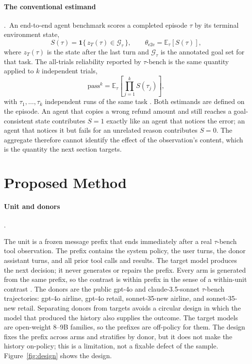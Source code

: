 \documentclass[a4paper,fleqn]{cas-sc}
\begin{document}
\paragraph{The conventional estimand}.\
An end-to-end agent benchmark scores a completed episode $\tau$ by its terminal environment state,
\begin{equation}
  S(\tau)=\mathbf{1}\{\,z_T(\tau)\in\mathcal{G}_\tau\,\},
  \qquad
  \theta_{\mathrm{e2e}}=\mathbb{E}_{\tau}\!\left[S(\tau)\right],
  \label{eq:e2e}
\end{equation}
where $z_T(\tau)$ is the state after the last turn and $\mathcal{G}_\tau$ is the annotated goal
set for that task. The all-trials reliability reported by $\tau$-bench is the same quantity
applied to $k$ independent trials,
\begin{equation}
  \mathrm{pass}^{k}=\mathbb{E}_{\tau}\!\left[\prod_{j=1}^{k}S(\tau_j)\right],
  \label{eq:passk}
\end{equation}
with $\tau_1,\dots,\tau_k$ independent runs of the same task \cite{taubench}. Both estimands are
defined on the episode. An agent that copies a wrong refund amount and still reaches a
goal-consistent state contributes $S=1$ exactly like an agent that notices the error; an agent
that notices it but fails for an unrelated reason contributes $S=0$. The aggregate therefore
cannot identify the effect of the observation's content, which is the quantity the next section
targets.

\section{Proposed Method}\label{sec:method}

\paragraph{Unit and donors}.\

The unit is a frozen message prefix that ends immediately after a real $\tau$-bench tool
observation. The prefix contains the system policy, the user turns, the donor assistant turns,
and all prior tool calls and results. The target model produces the next decision; it never
generates or repairs the prefix. Every arm is generated from the same prefix, so the contrast is
within prefix in the sense of a within-unit contrast \cite{causal}. The donors are the
public gpt-4o and claude-3.5-sonnet $\tau$-bench trajectories: gpt-4o airline, gpt-4o retail,
sonnet-35-new airline, and sonnet-35-new retail. Separating donors from targets avoids a circular
design in which the model that produced the history also supplies the outcome. The target models
are open-weight 8--9B families, so the prefixes are off-policy for them. The design fixes the
prefix across arms and stratifies by donor, but it does not make the history on-policy; this is a
limitation, not a fixable defect of the sample. Figure~\ref{fig:design} shows the design.
\end{document}
